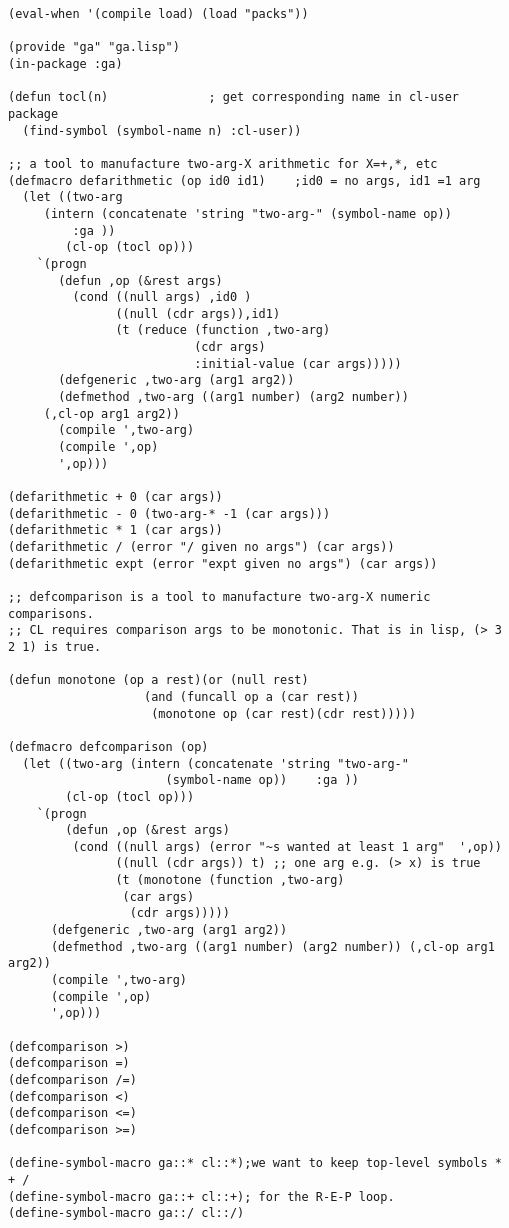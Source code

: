 \documentclass{article}
\begin{document}
{\begin{verbatim}
(eval-when '(compile load) (load "packs"))

(provide "ga" "ga.lisp")
(in-package :ga)

(defun tocl(n)				; get corresponding name in cl-user package
  (find-symbol (symbol-name n) :cl-user))

;; a tool to manufacture two-arg-X arithmetic for X=+,*, etc
(defmacro defarithmetic (op id0 id1)	;id0 = no args, id1 =1 arg
  (let ((two-arg
	 (intern (concatenate 'string "two-arg-" (symbol-name op))
		 :ga ))
        (cl-op (tocl op)))
    `(progn
       (defun ,op (&rest args)
         (cond ((null args) ,id0 )
               ((null (cdr args)),id1)
               (t (reduce (function ,two-arg)
                          (cdr args)
                          :initial-value (car args)))))
       (defgeneric ,two-arg (arg1 arg2))
       (defmethod ,two-arg ((arg1 number) (arg2 number))
	 (,cl-op arg1 arg2))
       (compile ',two-arg)
       (compile ',op)
       ',op)))

(defarithmetic + 0 (car args))
(defarithmetic - 0 (two-arg-* -1 (car args)))
(defarithmetic * 1 (car args))
(defarithmetic / (error "/ given no args") (car args))
(defarithmetic expt (error "expt given no args") (car args))

;; defcomparison is a tool to manufacture two-arg-X numeric comparisons.
;; CL requires comparison args to be monotonic. That is in lisp, (> 3 2 1) is true.

(defun monotone (op a rest)(or (null rest)
			       (and (funcall op a (car rest))
				    (monotone op (car rest)(cdr rest)))))

(defmacro defcomparison (op)
  (let ((two-arg (intern (concatenate 'string "two-arg-" 
				      (symbol-name op))    :ga ))
        (cl-op (tocl op)))
    `(progn
        (defun ,op (&rest args)
         (cond ((null args) (error "~s wanted at least 1 arg"  ',op))
               ((null (cdr args)) t) ;; one arg e.g. (> x) is true
               (t (monotone (function ,two-arg)
			    (car args)
			     (cdr args)))))
      (defgeneric ,two-arg (arg1 arg2))
      (defmethod ,two-arg ((arg1 number) (arg2 number)) (,cl-op arg1 arg2))
      (compile ',two-arg)
      (compile ',op)
      ',op)))

(defcomparison >)
(defcomparison =)
(defcomparison /=)
(defcomparison <)
(defcomparison <=)
(defcomparison >=)

(define-symbol-macro ga::* cl::*);we want to keep top-level symbols * + /
(define-symbol-macro ga::+ cl::+); for the R-E-P loop.
(define-symbol-macro ga::/ cl::/)


\end{verbatim}}
\end{document}
